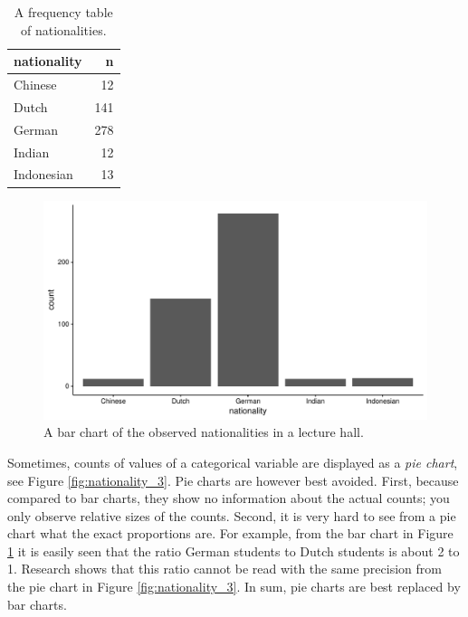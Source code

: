 \documentclass[]{book}\usepackage[]{graphicx}\usepackage[]{color}
\makeatletter
\def\maxwidth{ %
  \ifdim\Gin@nat@width>\linewidth
    \linewidth
  \else
    \Gin@nat@width
  \fi
}
\newenvironment{knitrout}{}{} %
\makeatother
\begin{document}
\begin{table}[ht]
\centering
\caption{A frequency table of nationalities.} 
\label{tab:nationality_1}
\begin{tabular}{lr}
  \hline
nationality & n \\ 
  \hline
Chinese & 12 \\ 
  Dutch & 141 \\ 
  German & 278 \\ 
  Indian & 12 \\ 
  Indonesian & 13 \\ 
   \hline
\end{tabular}
\end{table}


\begin{knitrout}
\color{fgcolor}\begin{figure}

{\centering \includegraphics[width=\maxwidth]{figure/nationality_2-1} 

}

\caption[A bar chart of the observed nationalities in a lecture hall]{A bar chart of the observed nationalities in a lecture hall.}\label{fig:nationality_2}
\end{figure}


\end{knitrout}

Sometimes, counts of values of a categorical variable are displayed as a \textit{pie chart}, see Figure \ref{fig:nationality_3}. Pie charts are however best avoided. First, because compared to bar charts, they show no information about the actual counts; you only observe relative sizes of the counts. Second, it is very hard to see from a pie chart what the exact proportions are. For example, from the bar chart in Figure \ref{fig:nationality_2} it is easily seen that the ratio German students to Dutch students is about 2 to 1. Research shows that this ratio cannot be read with the same precision from the pie chart in Figure \ref{fig:nationality_3}. In sum, pie charts are best replaced by bar charts.
\end{document}
